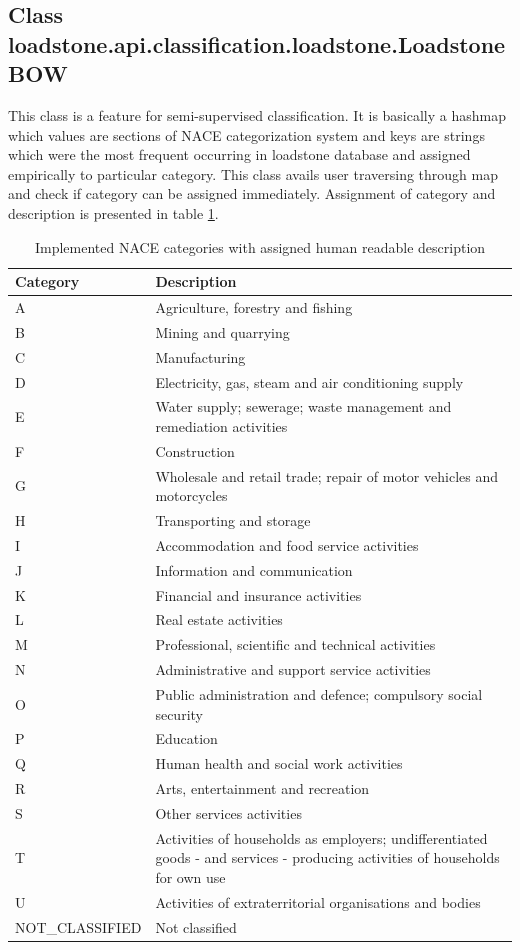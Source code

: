 \subsection{Class \newline loadstone.api.classification.loadstone.LoadstoneBOW}
\label{loadstone_bow}
This class is a feature for semi-supervised classification. It is basically a hashmap which values are sections of NACE categorization system and keys are strings which were the most frequent occurring in loadstone database and assigned empirically to particular category. This class avails user traversing through map and check if category can be assigned immediately. Assignment of category and description is presented in table \ref{tab:BowMatching}.
\begin{table}[H] 
	\begin{tabular}{ | l | l |}
		\hline
		Category & Description\tabularnewline \hline
	A & Agriculture, forestry and fishing\\
	B & Mining and quarrying\\
	C & Manufacturing\\
	D & Electricity, gas, steam and air conditioning supply\\
	E & Water supply; sewerage; waste management and remediation activities\\
	F & Construction\\
	G & Wholesale and retail trade; repair of motor vehicles and motorcycles\\
	H & Transporting and storage\\
	I & Accommodation and food service activities\\
	J & Information and communication\\
	K & Financial and insurance activities\\
	L & Real estate activities\\
	M & Professional, scientific and technical activities\\
	N & Administrative and support service activities\\
	O & Public administration and defence; compulsory social security\\
	P & Education\\
	Q & Human health and social work activities\\
	R & Arts, entertainment and recreation\\
	S & Other services activities\\
	T & Activities of households as employers; undifferentiated goods - and services - producing activities of households for own use\\
	U & Activities of extraterritorial organisations and bodies\\
	NOT\_CLASSIFIED & Not classified\\ 		
		\hline
	\end{tabular}
	\caption{Implemented NACE categories with assigned human readable description}
	\label{tab:BowMatching}
\end{table} 



